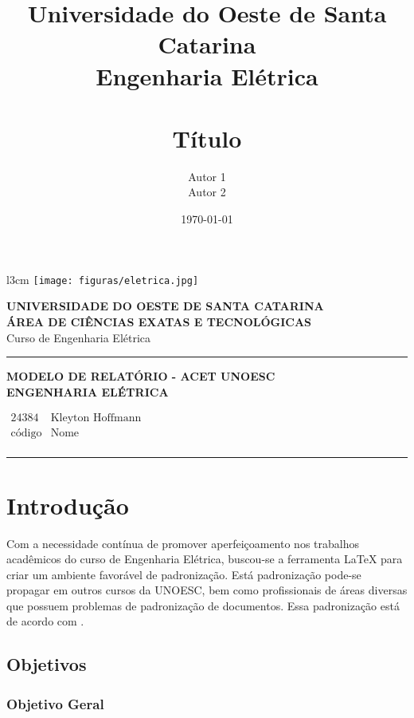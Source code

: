 \documentclass[a4paper,12pt,ruledheader,onecolumn,ceqn]{article}
\title{	
	\normalfont \normalsize 
	\Large \textbf{Universidade do Oeste de Santa Catarina} \\ %
	\large Engenharia Elétrica \\ [0.1cm] %
	\HorRule{1.5pt} \\ 			%
	\textbf{Título} \\ 			%
}
\author{Autor 1 \\
	Autor 2}                    %
\date{\normalfont\today}    %
\newcommand{\HorRule}[1]{\noindent\rule{\linewidth}{#1}}
\begin{document}
\begin{wrapfigure}[2]{l}{3cm}
\vspace{-0.4cm}
\texttt{[image: figuras/eletrica.jpg]}
\end{wrapfigure} 

\hspace*{1.2cm} \textbf{UNIVERSIDADE DO OESTE DE SANTA CATARINA} \\
\hspace*{2.1cm} \textbf{ÁREA DE CIÊNCIAS EXATAS E TECNOLÓGICAS} \\
\hspace*{8.0cm} Curso de Engenharia Elétrica 

\HorRule{1.0pt}  			%
\begin{center}
\large\textrm{\textbf{MODELO DE RELATÓRIO - ACET UNOESC \\ ENGENHARIA ELÉTRICA}} 
\end{center}

\vspace{0.5cm}
\hspace{-1.05cm}
$\left. \begin{array}{ll} 
\mbox{24384} & \mbox{Kleyton Hoffmann} \\
\mbox{código} & \mbox{Nome} \\
\end{array} \right.$

\HorRule{1.0pt}  			%


\section{Introdução}

Com a necessidade contínua de promover aperfeiçoamento nos trabalhos acadêmicos do curso de Engenharia Elétrica, buscou-se a ferramenta \LaTeX \cite{abntex2modelo} para criar um ambiente favorável de padronização. Está padronização pode-se propagar em outros cursos da UNOESC, bem como profissionais de áreas diversas que possuem problemas de padronização de documentos. Essa padronização está de acordo com . 

\subsection{Objetivos}

\subsubsection{Objetivo Geral}
\end{document}
